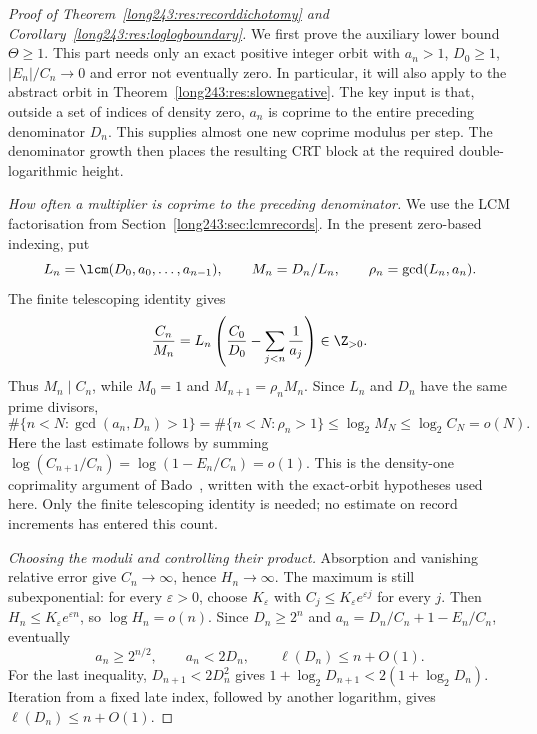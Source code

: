 \begin{proof}[Proof of Theorem~\ref{long243:res:recorddichotomy} and
Corollary~\ref{long243:res:loglogboundary}]
We first prove the auxiliary lower bound $\Theta\ge1$. This part needs
only an exact positive integer orbit with $a_n>1$, $D_0\ge1$,
$|E_n|/C_n\to0$ and error not eventually zero. In particular, it will also
apply to the abstract orbit in Theorem~\ref{long243:res:slownegative}.
The key input is that, outside a set of indices of density zero,
$a_n$ is coprime to the entire preceding denominator $D_n$. This supplies
almost one new coprime modulus per step. The denominator growth then
places the resulting CRT block at the required double-logarithmic height.

\emph{How often a multiplier is coprime to the preceding denominator.}
We use the LCM factorisation from
Section~\ref{long243:sec:lcmrecords}. In the present zero-based indexing, put
\[
 L_n=\lcm(D_0,a_0,\ldots,a_{n-1}),\qquad
 M_n=D_n/L_n,\qquad \rho_n=\gcd(L_n,a_n).
\]
The finite telescoping identity gives
\[
 \frac{C_n}{M_n}
 =L_n\left(\frac{C_0}{D_0}-\sum_{j<n}\frac1{a_j}\right)
 \in\Z_{>0}.
\]
Thus $M_n\mid C_n$, while $M_0=1$ and
$M_{n+1}=\rho_nM_n$. Since $L_n$ and $D_n$ have the same prime divisors,
\[
 \#\{n<N:\gcd(a_n,D_n)>1\}
 =\#\{n<N:\rho_n>1\}
 \le\log_2M_N\le\log_2C_N=o(N).
\]
Here the last estimate follows by summing
$\log(C_{n+1}/C_n)=\log(1-E_n/C_n)=o(1)$.
This is the density-one coprimality argument of
Bado~\cite[Theorem~9.1, p.~7]{bado2026}, written with the exact-orbit
hypotheses used here. Only the finite telescoping identity is needed;
no estimate on record increments has entered this count.

\emph{Choosing the moduli and controlling their product.}
Absorption and vanishing relative error give $C_n\to\infty$, hence
$H_n\to\infty$. The maximum is still subexponential: for every
$\varepsilon>0$, choose $K_\varepsilon$ with
$C_j\le K_\varepsilon e^{\varepsilon j}$ for every $j$. Then
$H_n\le K_\varepsilon e^{\varepsilon n}$, so $\log H_n=o(n)$.
Since $D_n\ge2^n$ and
$a_n=D_n/C_n+1-E_n/C_n$, eventually
\[
 a_n\ge2^{n/2},\qquad a_n<2D_n,\qquad \ell(D_n)\le n+O(1).
\]
For the last inequality, $D_{n+1}<2D_n^2$ gives
$1+\log_2D_{n+1}<2(1+\log_2D_n)$. Iteration from a fixed late index,
followed by another logarithm, gives $\ell(D_n)\le n+O(1)$.


\end{proof}
